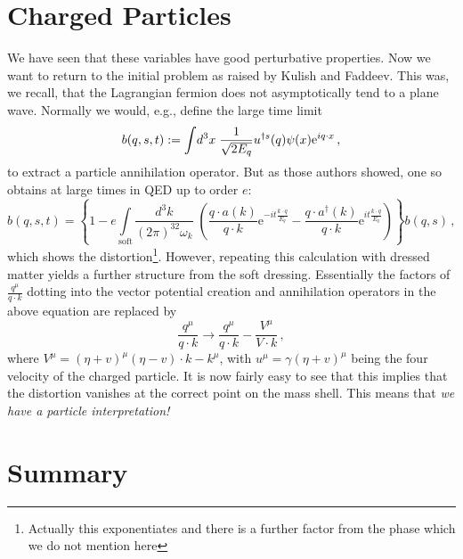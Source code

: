 \documentclass[12pt,a4paper]{article}
\newcommand{\soft}{{\mathrm{soft}}}
\newcommand{\ad}{{a^{\dag}}}
\newcommand{\cd}{\cdot}
\newcommand{\intx}{\int\!d^3x\;}
\newcommand{\intkstwo}{\int\limits_{\soft}\!\frac{d^3k}{(2\pi)^32\omega_k}\;}
\newcommand{\ecd}{{\cdot}}
\newcommand{\ex}{{\mathrm{e}}}
\begin{document}
\section*{Charged Particles}
We have seen that these variables have good perturbative properties. Now we want to return to the initial
problem as raised by
Kulish and Faddeev. This was, we recall,
that the Lagrangian fermion does not asymptotically tend to a plane wave. Normally
we would, e.g., define the large time limit
\begin{equation}
  b(q,s, t):=\intx\frac1{\sqrt{2E_{\smash{q}}}}u^{\dag s}(q)\psi(x)\ex^{iq\ecd
  x}\,,
\end{equation}
to extract a particle annihilation operator. But as those authors showed, one so obtains at large
times in QED up to order $e$:
\begin{equation}
  b(q,s,t)=\left\{1-e\!\!\intkstwo\!
  \left(
  \frac{q\cd a(k)}{q\cd k}\ex^{-it\frac{k\ecd q}{E_q}} -
\frac{q\cd \ad(k)}{q\cd k}\ex^{it\frac{k\ecd q}{E_q}}
  \right)\right\}b(q,s)\,,
\end{equation}
which shows the distortion\footnote{Actually this exponentiates and there is a
further factor from the phase which we do not mention here}. However,
repeating this calculation with dressed matter yields a further structure from the soft dressing. Essentially the
factors of $\frac{q^\mu}{q\ecd k}$ dotting into the vector potential
creation and annihilation operators in the above equation are replaced by
\begin{equation}
  \frac{q^\mu}{q\ecd k}\to\frac{q^\mu}{q\ecd k}-\frac{V^\mu}{V\ecd k}
  \,,
\end{equation}
where $V^\mu=(\eta+v)^\mu(\eta-v)\cd k-k^\mu$, with $u^\mu=\gamma(\eta+v)^\mu$ being
the four velocity of the charged particle. It is now fairly easy to
see\cite{Bagan:2000mk,Bagan:1999jf} that this implies
that the distortion vanishes at the correct point on the
mass shell. This means that \emph{we have a particle interpretation!}

\section*{Summary}
\end{document}

